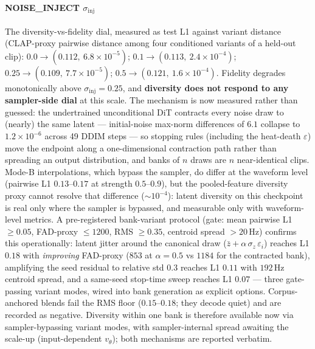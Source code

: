 \documentclass[12pt,a4paper]{article}
\begin{document}
\paragraph{NOISE\_INJECT $\sigma_{\mathrm{inj}}$}
The diversity-vs-fidelity dial, measured as test L1 against variant
distance (CLAP-proxy pairwise distance among four conditioned variants
of a held-out clip):
$0.0 \to (0.112,\ 6.8{\times}10^{-5})$;
$0.1 \to (0.113,\ 2.4{\times}10^{-4})$;
$0.25 \to (0.109,\ 7.7{\times}10^{-5})$;
$0.5 \to (0.121,\ 1.6{\times}10^{-4})$.
Fidelity degrades monotonically above $\sigma_{\mathrm{inj}}{=}0.25$, and
\textbf{diversity does not respond to any sampler-side dial} at this
scale. The mechanism is now measured rather than guessed: the
undertrained unconditional DiT contracts every noise draw to (nearly)
the same latent — initial-noise max-norm differences of $6.1$ collapse
to $1.2\times10^{-6}$ across 49 DDIM steps — so stopping rules
(including the heat-death $\varepsilon$) move the endpoint along a
one-dimensional contraction path rather than spreading an output
distribution, and banks of $n$ draws are $n$ near-identical clips.
Mode-B interpolations, which bypass the sampler, do differ at the
waveform level (pairwise L1 $0.13$–$0.17$ at strength $0.5$–$0.9$), but
the pooled-feature diversity proxy cannot resolve that difference
($\sim\!10^{-4}$): latent diversity on this checkpoint is real only
where the sampler is bypassed, and measurable only with waveform-level
metrics. A pre-registered bank-variant protocol (gate: mean pairwise
L1 $\ge 0.05$, FAD-proxy $\le 1200$, RMS $\ge 0.35$, centroid spread
$> 20$\,Hz) confirms this operationally: latent jitter around the
canonical draw ($\bar{z} + \alpha\,\sigma_z\,\varepsilon_i$) reaches
L1 $0.18$ with \emph{improving} FAD-proxy ($853$ at $\alpha{=}0.5$ vs
$1184$ for the contracted bank), amplifying the seed residual to
relative std $0.3$ reaches L1 $0.11$ with $192$\,Hz centroid spread,
and a same-seed stop-time sweep reaches L1 $0.07$ — three gate-passing
variant modes, wired into bank generation as explicit options.
Corpus-anchored blends fail the RMS floor ($0.15$–$0.18$; they decode
quiet) and are recorded as negative. Diversity within one bank is
therefore available now via sampler-bypassing variant modes, with
sampler-internal spread awaiting the scale-up (input-dependent
$v_\theta$); both mechanisms are reported verbatim.
\end{document}
